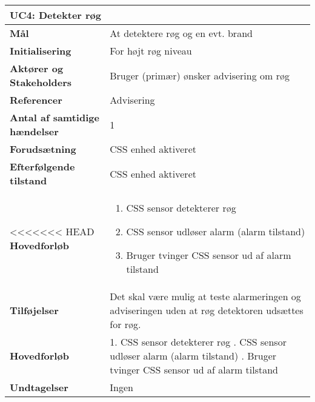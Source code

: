 \begin{table}[H] \centering
\begin{tabular}{|p{6cm}|p{8cm}|}
	\hline
\multicolumn{2}{|l|}{\textbf{UC4: Detekter røg}} \\\hline
\textbf{Mål}								&At detektere røg og en evt. brand \\\hline
\textbf{Initialisering}					&For højt røg niveau\\\hline
\textbf{Aktører og Stakeholders}			&Bruger (primær) ønsker advisering om røg \\\hline
\textbf{Referencer}						&Advisering \\\hline
\textbf{Antal af samtidige hændelser}	&1 \\\hline
\textbf{Forudsætning}					&CSS enhed aktiveret  \\\hline
\textbf{Efterfølgende tilstand}			&CSS enhed aktiveret \\\hline
<<<<<<< HEAD
\textbf{Hovedforløb}						&\begin{enumerate}
\item CSS sensor detekterer røg 

\item CSS sensor udløser alarm (alarm tilstand)

\item Bruger tvinger CSS sensor ud af alarm tilstand

\end{enumerate}\\\hline

\textbf{Tilføjelser}						&Det skal være mulig at teste alarmeringen og adviseringen uden at røg detektoren udsættes for røg.\\\hline
\textbf{Hovedforløb}						&   
1. CSS sensor detekterer røg \newline 
2. CSS sensor udløser alarm (alarm tilstand) \newline 
3. Bruger tvinger CSS sensor ud af alarm tilstand\\\hline
\textbf{Undtagelser}						&Ingen \\\hline
	\end{tabular}
	\label{UC4} 
\end{table}